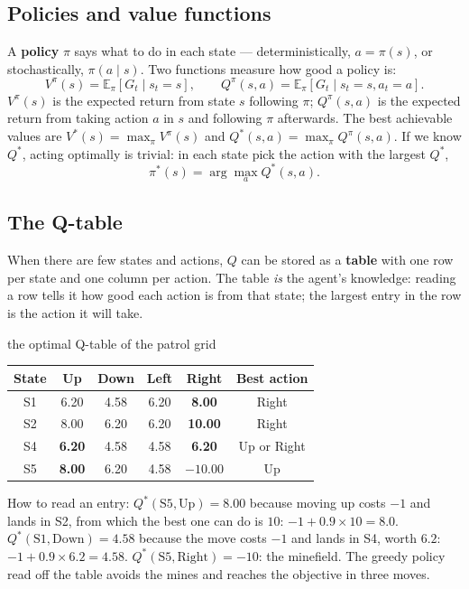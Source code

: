 \documentclass[11pt]{article}
\begin{document}
\subsection{Policies and value functions}
A \textbf{policy} $\pi$ says what to do in each state --- deterministically, $a=\pi(s)$, or stochastically, $\pi(a\mid s)$. Two functions measure how good a policy is:
\[V^\pi(s)=\mathbb E_\pi[G_t\mid s_t=s],\qquad Q^\pi(s,a)=\mathbb E_\pi[G_t\mid s_t=s,a_t=a].\]
$V^\pi(s)$ is the expected return from state $s$ following $\pi$; $Q^\pi(s,a)$ is the expected return from taking action $a$ in $s$ and following $\pi$ afterwards. The best achievable values are $V^*(s)=\max_\pi V^\pi(s)$ and $Q^*(s,a)=\max_\pi Q^\pi(s,a)$. If we know $Q^*$, acting optimally is trivial: in each state pick the action with the largest $Q^*$,
\[\pi^*(s)=\arg\max_aQ^*(s,a).\]

\subsection{The Q-table}
When there are few states and actions, $Q$ can be stored as a \textbf{table} with one row per state and one column per action. The table \emph{is} the agent's knowledge: reading a row tells it how good each action is from that state; the largest entry in the row is the action it will take.
\begin{example}{the optimal Q-table of the patrol grid}
\begin{center}\small\renewcommand{\arraystretch}{1.25}\begin{tabular}{c|cccc|c}\toprule State & Up & Down & Left & Right & Best action\\\midrule
S1 & 6.20 & 4.58 & 6.20 & \textbf{8.00} & Right\\
S2 & 8.00 & 6.20 & 6.20 & \textbf{10.00} & Right\\
S4 & \textbf{6.20} & 4.58 & 4.58 & \textbf{6.20} & Up or Right\\
S5 & \textbf{8.00} & 6.20 & 4.58 & $-10.00$ & Up\\\bottomrule\end{tabular}\end{center}
How to read an entry: $Q^*(\text{S5},\text{Up})=8.00$ because moving up costs $-1$ and lands in S2, from which the best one can do is $10$: $-1+0.9\times10=8.0$. $Q^*(\text{S1},\text{Down})=4.58$ because the move costs $-1$ and lands in S4, worth $6.2$: $-1+0.9\times6.2=4.58$. $Q^*(\text{S5},\text{Right})=-10$: the minefield. The greedy policy read off the table avoids the mines and reaches the objective in three moves.
\end{example}
\end{document}

